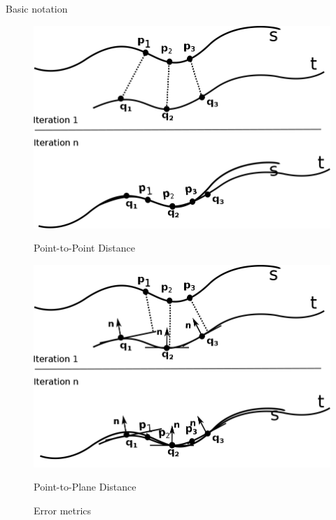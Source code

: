 \documentclass[aspectratio=1610]{beamer}
\renewcommand*{\cite}{\parencite}
\begin{document}
\begin{frame}[allowframebreaks]{Basic notation}
\begin{figure}[htbp]
\begin{center}
\begin{minipage}[b]{0.45\linewidth}
  \centering
  \includegraphics[width=\textwidth,keepaspectratio]{imgs/pt2pt.png}
  \caption{Point-to-Point Distance}
  \label{fig:pt2pt}
\end{minipage}
\begin{minipage}[b]{0.45\linewidth}
  \centering
  \includegraphics[width=\textwidth,keepaspectratio]{imgs/pt2plane.png}
  \caption{Point-to-Plane Distance}
  \label{fig:pt2pl}
\end{minipage}
\end{center}
\caption{Error metrics \cite{bellekens2014survey}}
\end{figure}

\framebreak


\end{frame}
\end{document}

